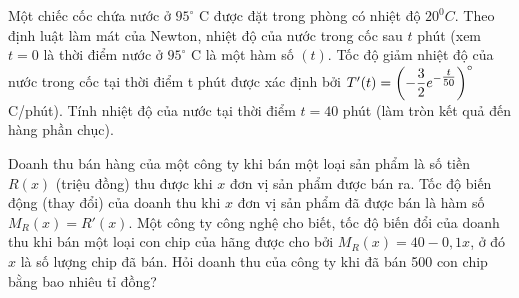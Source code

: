 \begin{ex}%
Một chiếc cốc chứa nước ở $95^\circ$ C được đặt trong phòng có nhiệt độ ${{20}^{0}}C$. Theo định luật làm mát của Newton, nhiệt độ của nước trong cốc sau $t$ phút (xem $t=0$ là thời điểm nước ở $95^\circ$ C là một hàm số $(t)$. Tốc độ giảm nhiệt độ của nước trong cốc tại thời điểm t phút được xác định bởi $T'(t)=\left(-\dfrac{3}{2} \mathrm\mathrm{e}^{-\tfrac{t}{50}}\right)^\circ$ C/phút). Tính nhiệt độ của nước tại thời điểm $t=40$ phút (làm tròn kết quả đến hàng phần chục).
\end{ex}

\begin{ex}%
Doanh thu bán hàng của một công ty khi bán một loại sản phẩm là số tiền $R(x)$ (triệu đồng) thu được khi $x$ đơn vị sản phẩm được bán ra. Tốc độ biến động (thay đổi) của doanh thu khi $x$ đơn vị sản phẩm đã được bán là hàm số $M_R(x)=R'(x)$. Một công ty công nghệ cho biết, tốc độ biến đổi của doanh thu khi bán một loại con chip của hãng được cho bởi $M_R(x)=40-0{,}1x$, ở đó $x$ là số lượng chip đã bán. Hỏi doanh thu của công ty khi đã bán 500 con chip bằng bao nhiêu tỉ đồng?
\end{ex}

